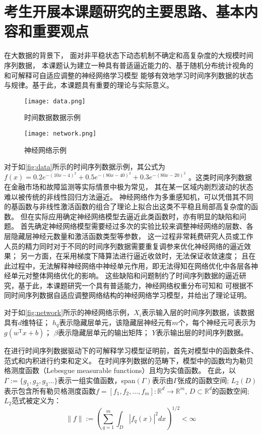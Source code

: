 \section{考生开展本课题研究的主要思路、基本内容和重要观点}\label{sec:2.4}
在大数据的背景下， 面对非平稳状态下动态机制不确定和高复杂度的大规模时间序列数据，
本课题认为建立一种具有普适逼近能力的、基于随机分布统计视角的和可解释可自适应调整的神经网络学习模型
能够有效地学习时间序列数据的状态与规律。基于此，本课题具有重要的理论与实际意义。
\begin{figure*}[ht]
    \centering
    \begin{minipage}{0.5\textwidth}
        \centering
        \texttt{[image: data.png]}
        \caption{\label{fig:data} 时间数据数据示例}
    \end{minipage}%
    \begin{minipage}{0.5\textwidth}
        \centering
        \texttt{[image: network.png]}
        \caption{\label{fig:network} 神经网络示例}
    \end{minipage}%
\end{figure*}

对于如\autoref{fig:data}所示的时间序列数据示例，其公式为$f(x)=0.2e^{-(10x-4)^{2}}+0.5e^{-(80x-40)^{2}}+0.3e^{-(80x-20)^{2}}$
。这类时间序列数据在金融市场和故障监测等实际情景中极为常见，
其在某一区域内剧烈波动的状态难以被传统的非线性回归方法逼近。
神经网络作为多重感知机，可以凭借其不同的基函数与非线性激活函数的组合了理论上拟合出这类不平稳且局部高复杂度的函数。
但在实际应用确定神经网络模型去逼近此类函数时，亦有明显的缺陷和问题。
首先确定神经网络模型需要经过多次的实验比较来调整神经网络的层数、各层隐藏层神经元数量和激活函数类型等参数，
这一过程非常耗费研究人员或工作人员的精力同时对于不同的时间序列数据需要重复调参来优化神经网络的逼近效果；
另一方面，在采用梯度下降算法进行逼近收敛时，无法保证收敛速度；
且在此过程中，无法解释神经网络中神经单元作用，即无法得知在网络优化中各层各神经单元对整体网络优化的影响。
这些缺陷和问题制约了时间序列数据的逼近研究，基于此，本课题研究一个具有普适能力，神经网络权重分布可知和
可根据不同时间序列数据自适应调整网络结构的神经网络学习模型，并给出了理论证明。

对于如\autoref{fig:network}所示的神经网络示例，$X_i$表示输入层的时间序列数据，该数据具有$d$维特征；
$h_q$表示隐藏层单元，该隐藏层神经元有$m$个，每个神经元可表示为$g(w^\mathrm{T}x+b)$；
$\beta$表示隐藏层单元的输出矩阵；
$Y$表示输出层的时间序列数据。

在进行时间序列数据驱动下的可解释学习模型证明前，首先对模型中的函数条件、范式和内积进行约束和定义。
在时间序列数据的范畴下，模型中的函数均为勒贝格测度函数（Lebesgue measurable functions）且均为实值函数。
在此，以$\Gamma:=\{g_1, g_2, g_3...\}$表示一组实值函数，span$(\Gamma)$表示由$\Gamma$张成的函数空间;
$L_{2}(D)$ 表示包含所有勒贝格测度函数$f=[f_1,f_2,\ldots,f_m]:\mathbb{R}^{d}\rightarrow \mathbb{R}^{m}$, $D\subset \mathbb{R}^{d}$的函数空间;
$L_2$范式被定义为：
\begin{equation}\label{multiple_lp}
    \|f\|:=\left(\sum_{q=1}^{m}\int_{D}|f_q(x)|^2dx\right)^{1/2}<\infty
  \end{equation}

